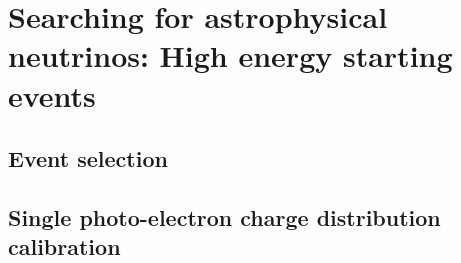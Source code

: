 \chapter{Searching for astrophysical neutrinos: High energy starting events}\label{chapter:selection}

\section{Event selection}\label{sec:selection}
\begingroup
\graphicspath{{results/HESE_Final_Paper/}}

\endgroup

\section{Single photo-electron charge distribution calibration\label{sec:charge_calibration}}
\begingroup
\graphicspath{{results/HESE_Final_Paper/}}

\endgroup